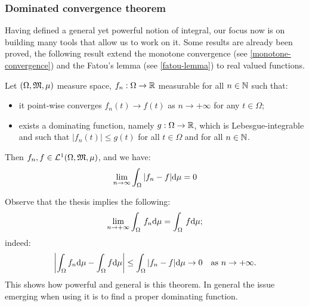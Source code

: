 \subsubsection{Dominated convergence theorem} \label{dominated-convergence}
Having defined a general yet powerful notion of integral, our focus now is on building many tools that allow us to work on it. Some results are already been proved, the following result extend the monotone convergence (see \vref{monotone-convergence}) and the Fatou's lemma (see \vref{fatou-lemma}) to real valued functions.

\begin{theo}
	Let $(\Omega, \mathfrak M, \mu)$ measure space, $f_n : \Omega \to \mathbb R$ measurable for all $n\in \mathbb N$ such that:
	\begin{itemize}
		\item it point-wise converges $f_n(t) \to f(t)$ as $n \to +\infty$ for any $t \in \Omega$;
		\item exists a dominating function, namely $g:\Omega \to \mathbb R$, which is Lebesgue-integrable and such that $|f_n(t)| \leq g(t)$ for all $t \in \Omega$ and for all $n \in \mathbb N$.
	\end{itemize}
	Then $f_n, f\in \mathcal L^1(\Omega, \mathfrak M, \mu )$, and we have:
	$$\lim_{n\to \infty} \int_{\Omega} |f_n-f|\mathrm d\mu = 0$$
\end{theo}

Observe that the thesis implies the following:
$$\lim_{n \to +\infty} \int_\Omega \, f_n \mathrm d\mu = \int_{\Omega}\, f \mathrm d\mu;$$
indeed:
$$\left| \int_\Omega f_n \mathrm d\mu - \int_{\Omega} f \mathrm d\mu \right|
\leq \int_{\Omega}|f_n-f| \mathrm d\mu \to 0 \quad \text{as } n \to +\infty.$$
This shows how powerful and general is this theorem. In general the issue emerging when using it is to find a proper dominating function.

